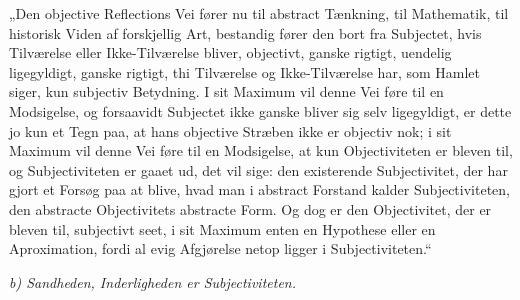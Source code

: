 „Den objective Reflections Vei fører nu til abstract Tænkning, til
Mathematik, til historisk Viden af forskjellig Art, bestandig
fører den bort fra Subjectet, hvis Tilværelse eller
Ikke-Tilværelse bliver, objectivt, ganske rigtigt, uendelig
ligegyldigt, ganske rigtigt, thi Tilværelse og Ikke-Tilværelse
har, som Hamlet siger, kun subjectiv Betydning. I sit Maximum vil
denne Vei føre til en Modsigelse, og forsaavidt Subjectet ikke
ganske bliver sig selv ligegyldigt, er dette jo kun et Tegn paa,
at hans objective Stræben ikke er objectiv nok; i sit Maximum vil
denne Vei føre til en Modsigelse, at kun Objectiviteten er bleven
til, og Subjectiviteten er gaaet ud, det vil sige: den existerende
Subjectivitet, der har gjort et Forsøg paa at blive, hvad man i
abstract Forstand kalder Subjectiviteten, den abstracte
Objectivitets abstracte Form. Og dog er den Objectivitet, der er
bleven til,
 subjectivt seet, i sit Maximum enten en Hypothese eller en
Aproximation, fordi al evig Afgjørelse netop ligger i
Subjectiviteten.“

\begin{center}
\emph{b) Sandheden, Inderligheden er Subjectiviteten.}
\end{center}

